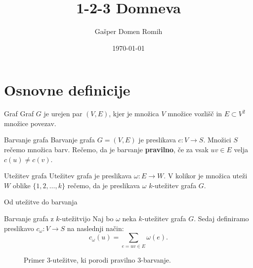 \documentclass{beamer}
\title{1-2-3 Domneva}
\author{Gašper Domen Romih}
\date{\today}
\begin{document}
\begin{frame}
	\titlepage
\end{frame}
\begin{frame}
\tableofcontents
\end{frame}
\section{Osnovne definicije}

\begin{frame}
\begin{block}{Graf}
Graf $G$ je urejen par $(V, E)$, kjer je množica $V$ množice vozlišč in $E \subset V^2$ množice povezav.
\end{block}

\begin{block}{Barvanje grafa}
	Barvanje grafa $G = (V, E)$ je preslikava $c : V \rightarrow S$. Množici $S$ rečemo množica barv. Rečemo, da je barvanje \textbf{pravilno}, če za vsak $uv \in E$ velja $c(u) \neq c(v)$.
\end{block}
\begin{block}{Utežitev grafa}
	Utežitev grafa je preslikava $\omega : E \rightarrow W$. V kolikor je množica uteži $W$ oblike $\{1,2,\ldots, k\}$ rečemo, da je preslikava $\omega$ $k$-utežitev grafa $G$.
\end{block}
\end{frame}

\begin{frame}{Od utežitve do barvanja}
\begin{block}{Barvanje grafa z $k$-utežitvijo}
	Naj bo $\omega$ neka $k$-utežitev grafa $G$. Sedaj definiramo preslikavo $c_{\omega} : V \rightarrow S$ na naslednji način:
	$$ c_{\omega}(u) = \sum_{e = uv \in E} \omega(e). $$
\end{block}
\begin{figure}
	\caption{Primer $3$-utežitve, ki porodi pravilno $3$-barvanje.}
\end{figure}

\end{frame}
\end{document}
